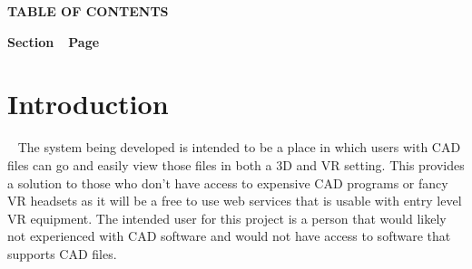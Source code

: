 \documentclass[letterpaper, 10pt, draftclsnofoot, onecolumn]{IEEEtran}
\begin{document}




{\centering{}\bfseries\color{black}
TABLE OF CONTENTS
\par}


\bigskip

{\bfseries\color{black}
Section\ \ Page}

\setcounter{tocdepth}{9}
\renewcommand\contentsname{}
\tableofcontents

\bigskip





\clearpage\clearpage\setcounter{page}{1}\pagestyle{Convertii}
\section[Introduction]{\rmfamily\bfseries\color{black}
Introduction}

\foreignlanguage{english}{\textit{}}\foreignlanguage{english}{ \ }
{\color{black}
The system being developed is intended to be a place in which users with CAD files can go and easily view those files in both a 3D and VR setting. This provides a solution to those who don't have access to expensive CAD programs or fancy VR headsets as it will be a free to use web services that is usable with entry level VR equipment. The intended user for this project is a person that would likely not experienced with CAD software and would not have access to software that supports CAD files.  }


\begin{comment}
\subsection[IDENTIFICATION]{\selectlanguage{english}\rmfamily\bfseries\color{black}
IDENTIFICATION}
{\selectlanguage{english}\itshape\color{black}
This paragraph shall contain a full identification of the system and the
software to which this document applies, including, as applicable,
identification number(s), title(s), abbreviation(s), version number(s),
and release number(s).}

{\selectlanguage{english}\color{black}
The software system being considered for development is referred to as [
insert name and or id number ]. \ The customer providing specifications
for the system is [ insert name and contact info ]. \ The ultimate
customer, or end-user, of the system will be [insert name and contact
info]. \ This is a [ new {\textbar} redesign ] project effort, so the
version under development is version [ insert version and release
number ].}
\end{comment}
\end{document}
